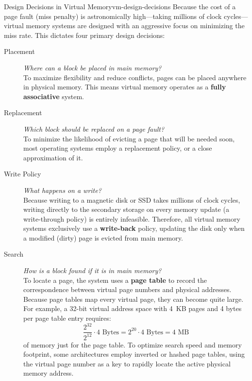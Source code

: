 \begin{concept}{Design Decisions in Virtual Memory}{vm-design-decisions}
    Because the cost of a page fault (miss penalty) is astronomically high—taking millions of clock cycles—virtual memory systems are designed with an aggressive focus on minimizing the miss rate. This dictates four primary design decisions:
    
    \begin{description}
        \item[Placement] \textit{Where can a block be placed in main memory?} \\
        To maximize flexibility and reduce conflicts, pages can be placed anywhere in physical memory. This means virtual memory operates as a \textbf{fully associative} system.
        
        \item[Replacement] \textit{Which block should be replaced on a page fault?} \\
        To minimize the likelihood of evicting a page that will be needed soon, most operating systems employ a  replacement policy, or a close approximation of it.
        
        \item[Write Policy] \textit{What happens on a write?} \\
        Because writing to a magnetic disk or SSD takes millions of clock cycles, writing directly to the secondary storage on every memory update (a write-through policy) is entirely infeasible. Therefore, all virtual memory systems exclusively use a \textbf{write-back} policy, updating the disk only when a modified (dirty) page is evicted from main memory.

        \item[Search] \textit{How is a block found if it is in main memory?}\\
        To locate a page, the system uses a \textbf{page table} to record the correspondence between virtual page numbers and physical addresses. Because page tables map every virtual page, they can become quite large. For example, a 32-bit virtual address space with 4~KB pages and 4 bytes per page table entry requires: 
        \[\frac{2^{32}}{2^{12}} \cdot 4\text{ Bytes} = 2^{20} \cdot 4\text{ Bytes} = 4\text{ MB}\]
        of memory just for the page table. To optimize search speed and memory footprint, some architectures employ inverted or hashed page tables, using the virtual page number as a key to rapidly locate the active physical memory address.
    \end{description}
\end{concept}

